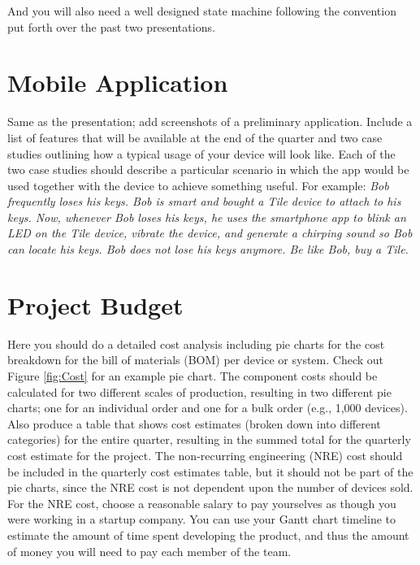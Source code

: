 \documentclass{sig-alternate-ipsn13}
\begin{document}
And you will also need a well designed state machine following the convention put forth over the past two presentations. 


\section{Mobile Application} 

Same as the presentation; add screenshots of a preliminary application. Include a list of features that will be available at the end of the quarter and two case studies outlining how a typical usage of your device will look like. Each of the two case studies should describe a particular scenario in which the app would be used together with the device to achieve something useful. For example:  \textit{Bob frequently loses his keys. Bob is smart and bought a Tile device to attach to his keys. Now, whenever Bob loses his keys, he uses the smartphone app to blink an LED on the Tile device, vibrate the device, and generate a chirping sound so Bob can locate his keys. Bob does not lose his keys anymore. Be like Bob, buy a Tile.}


\section{Project Budget} 

Here you should do a detailed cost analysis including pie charts for the cost breakdown for the bill of materials (BOM) per device or system. Check out Figure \ref{fig:Cost} for an example pie chart. The component costs should be calculated for two different scales of production, resulting in two different pie charts; one for an individual order and one for a bulk order (e.g., 1,000 devices). Also produce a table that shows cost estimates (broken down into different categories) for the entire quarter, resulting in the summed total for the quarterly cost estimate for the project. The non-recurring engineering (NRE) cost should be included in the quarterly cost estimates table, but it should not be part of the pie charts, since the NRE cost is not dependent upon the number of devices sold. For the NRE cost, choose a reasonable salary to pay yourselves as though you were working in a startup company. You can use your Gantt chart timeline to estimate the amount of time spent developing the product, and thus the amount of money you will need to pay each member of the team.
\end{document}
